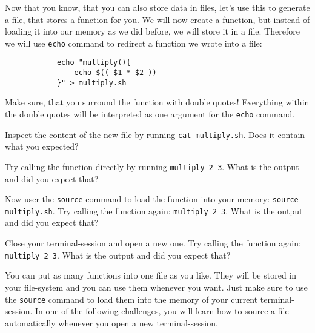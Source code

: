 \begin{challenge}
    \begin{task}
        Now that you know, that you can also store data in files, let's use this to generate a file, that stores a function for you.
        We will now create a function, but instead of loading it into our memory as we did before, we will store it in a file.
        Therefore we will use \texttt{echo} command to redirect a function we wrote into a file:
        \begin{lstlisting}
            echo "multiply(){
                echo $(( $1 * $2 ))
            }" > multiply.sh
        \end{lstlisting}
        Make sure, that you surround the function with double quotes! 
        Everything within the double quotes will be interpreted as one argument for the \texttt{echo} command.
        \begin{questions}
            \item Inspect the content of the new file by running \texttt{cat multiply.sh}. Does it contain what you expected?
            \item Try calling the function directly by running \texttt{multiply 2 3}. What is the output and did you expect that?
            \item Now user the \texttt{source} command to load the function into your memory: \texttt{source multiply.sh}. Try calling the function again: \texttt{multiply 2 3}. What is the output and did you expect that?
            \item Close your terminal-session and open a new one. Try calling the function again: \texttt{multiply 2 3}. What is the output and did you expect that?
        \end{questions}
    \end{task}


    \begin{advice}
        You can put as many functions into one file as you like. 
        They will be stored in your file-system and you can use them whenever you want. 
        Just make sure to use the \texttt{source} command to load them into the memory of your current terminal-session.
        In one of the following challenges, you will learn how to source a file automatically whenever you open a new terminal-session.
    \end{advice}
\end{challenge}
